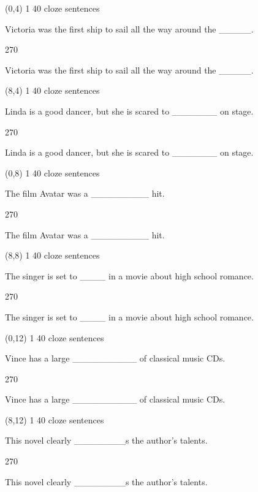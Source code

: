 \documentclass[a4paper]{article}
\newenvironment{itemize*}%
{\begin{itemize}%
 \setlength{\itemsep}{0.5cm}%
 \setlength{\parsep}{0pt}%
 \setlength{\parskip}{0pt}}%
{\end{itemize}}
\newcommand{\mycard}[3]{%
	\small #1 #2
	\par
	\parbox[t][6.8cm][c]{9.5cm}{%
	\par
	\myleft{#3}
	\par
	\myright{#3}
	}
}
\newcommand{\myleft}[1]{%
	\begin{sideways}
	\hspace*{-0.9cm}
		\parbox[t][2.7cm][t]{6.5cm}{%
		\large #1
		}
	\end{sideways}
}
\newcommand{\myright}[1]{%
	\hspace*{6.5cm}
	\begin{turn}{270}
	\hspace*{-7.1cm}
		\parbox[t][2.7cm][t]{6.5cm}{%
		\large #1
		}
	\end{turn}
}
\begin{document}
\begin{textblock}{8}(0,4)
\mycard{1}{40 cloze sentences}{
\begin{itemize*}
\item Victoria was the first ship to sail all the way around the \_\_\_\_\_.
\end{itemize*}
}
\end{textblock}

\begin{textblock}{8}(8,4)
\mycard{1}{40 cloze sentences}{
\begin{itemize*}
\item Linda is a good dancer, but she is scared to \_\_\_\_\_\_\_ on stage.
\end{itemize*}
}
\end{textblock}

\begin{textblock}{8}(0,8)
\mycard{1}{40 cloze sentences}{
\begin{itemize*}
\item The film Avatar was a \_\_\_\_\_\_\_\_\_ hit.
\end{itemize*}
}
\end{textblock}

\begin{textblock}{8}(8,8)
\mycard{1}{40 cloze sentences}{
\begin{itemize*}
\item The singer is set to \_\_\_\_ in a movie about high school romance.
\end{itemize*}
}
\end{textblock}

\begin{textblock}{8}(0,12)
\mycard{1}{40 cloze sentences}{
\begin{itemize*}
\item Vince has a large \_\_\_\_\_\_\_\_\_\_ of classical music CDs.
\end{itemize*}
}
\end{textblock}

\begin{textblock}{8}(8,12)
\mycard{1}{40 cloze sentences}{
\begin{itemize*}
\item This novel clearly \_\_\_\_\_\_\_\_s the author's talents.
\end{itemize*}
}
\end{textblock}
\end{document}

